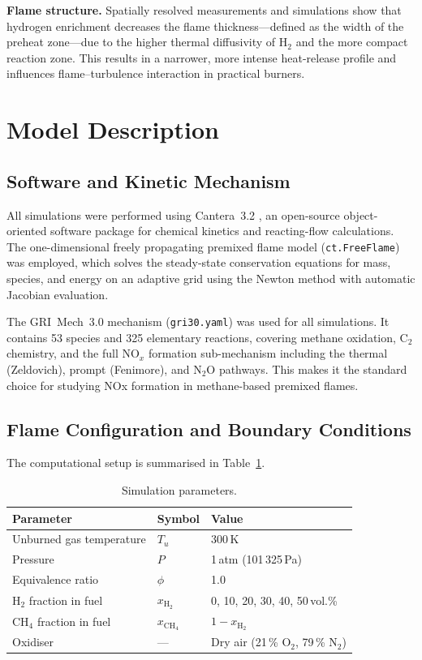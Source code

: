 \documentclass[12pt,a4paper]{article}
\begin{document}
\textbf{Flame structure.} Spatially resolved measurements and simulations show
that hydrogen enrichment decreases the flame thickness---defined as the width of
the preheat zone---due to the higher thermal diffusivity of H$_2$ and the more
compact reaction zone. This results in a narrower, more intense heat-release
profile and influences flame--turbulence interaction in practical burners.

\section{Model Description}
\label{sec:model}

\subsection{Software and Kinetic Mechanism}

All simulations were performed using Cantera~3.2 \cite{Cantera}, an open-source
object-oriented software package for chemical kinetics and reacting-flow
calculations. The one-dimensional freely propagating premixed flame model
(\texttt{ct.FreeFlame}) was employed, which solves the steady-state conservation
equations for mass, species, and energy on an adaptive grid using the Newton
method with automatic Jacobian evaluation.

The GRI~Mech~3.0 mechanism \cite{Smith1999} (\texttt{gri30.yaml}) was used for
all simulations. It contains 53 species and 325 elementary reactions, covering
methane oxidation, C$_2$ chemistry, and the full NO$_x$ formation sub-mechanism
including the thermal (Zeldovich), prompt (Fenimore), and N$_2$O pathways. This
makes it the standard choice for studying NOx formation in methane-based premixed
flames.

\subsection{Flame Configuration and Boundary Conditions}

The computational setup is summarised in Table~\ref{tab:conditions}.

\begin{table}[htbp]
  \centering
  \caption{Simulation parameters.}
  \label{tab:conditions}
  \begin{tabular}{lll}
    \toprule
    Parameter & Symbol & Value \\
    \midrule
    Unburned gas temperature & $T_u$ & 300\,K \\
    Pressure                 & $P$   & 1\,atm (101\,325\,Pa) \\
    Equivalence ratio        & $\phi$ & 1.0 \\
    H$_2$ fraction in fuel   & $x_{\mathrm{H_2}}$ & 0, 10, 20, 30, 40, 50\,vol.\% \\
    CH$_4$ fraction in fuel  & $x_{\mathrm{CH_4}}$ & $1 - x_{\mathrm{H_2}}$ \\
    Oxidiser                 & ---   & Dry air (21\,\% O$_2$, 79\,\% N$_2$) \\
    \bottomrule
  \end{tabular}
\end{table}
\end{document}
